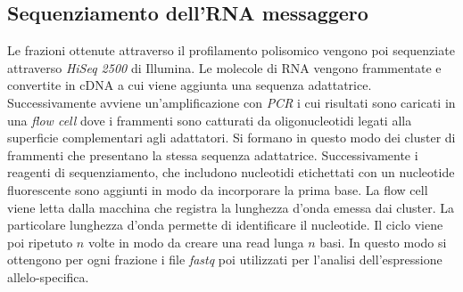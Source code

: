 \subsection{Sequenziamento dell'RNA messaggero}
Le frazioni ottenute attraverso il profilamento polisomico vengono poi sequenziate attraverso \emph{HiSeq 2500} di Illumina.
Le molecole di RNA vengono frammentate e convertite in cDNA a cui viene aggiunta una sequenza adattatrice.
Successivamente avviene un'amplificazione con \emph{PCR} i cui risultati sono caricati in una \emph{flow cell} dove i frammenti sono catturati da oligonucleotidi legati alla superficie complementari agli adattatori.
Si formano in questo modo dei cluster di frammenti che presentano la stessa sequenza adattatrice.
Successivamente i reagenti di sequenziamento, che includono nucleotidi etichettati con un nucleotide fluorescente sono aggiunti in modo da incorporare la prima base.
La flow cell viene letta dalla macchina che registra la lunghezza d'onda emessa dai cluster.
La particolare lunghezza d'onda permette di identificare il nucleotide.
Il ciclo viene poi ripetuto $n$ volte in modo da creare una read lunga $n$ basi.
In questo modo si ottengono per ogni frazione i file \emph{fastq} poi utilizzati per l'analisi dell'espressione allelo-specifica.
